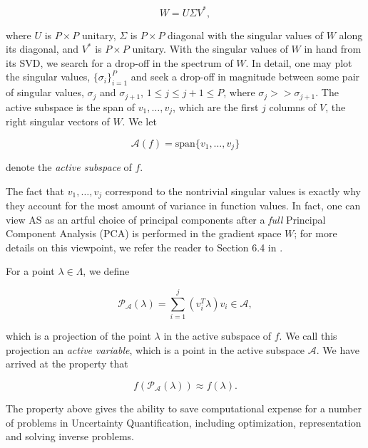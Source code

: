 \documentclass{amsart}
\newcommand{\A}{\mathcal{A}}
\begin{document}
\begin{equation} \label{eq:5}
W=U\Sigma V^*,
\end{equation} 

\noindent where $U$ is $P \times P$ unitary, $\Sigma$ is $P \times P$ diagonal with the singular values of $W$ along its diagonal, and $V^*$ is $P \times P$ unitary. With the singular values of $W$ in hand from its SVD, we search for a drop-off in the spectrum of $W$. In detail, one may plot the singular values, $\{\sigma_i\}_{i=1}^P$ and seek a drop-off in magnitude between some pair of singular values, $\sigma_{j}$ and $\sigma_{j+1}$, $1\leq j \leq j+1 \leq P$, where $\sigma_{j}>>\sigma_{j+1}$. The active subspace is the span of $v_1,\ldots,v_{j}$, which are the first $j$ columns of $V$, the right singular vectors of $W$. We let

\begin{equation} \label{eq:6}
\A(f)=\text{span}\{v_1,\ldots,v_j\}
\end{equation}

\noindent denote the \textit{active subspace} of $f$.


The fact that $v_1,\ldots,v_{j}$ correspond to the nontrivial singular values is exactly why they account for the most amount of variance in function values. In fact, one can view AS as an artful choice of principal components after a \textit{full} Principal Component Analysis (PCA) is performed in the gradient space $W$; for more details on this viewpoint, we refer the reader to Section 6.4 in \cite{Russi}.

For a point $\lambda \in \Lambda$, we define

\begin{equation} \label{eq:7}
  \mathcal{P}_\A(\lambda)=\sum_{i=1}^{j}\left( v_i^T \lambda\right)v_i \in \A, 
\end{equation}

\noindent which is a projection of the point $\lambda$ in the active subspace of $f$. We call this projection an \textit{active variable}, which is a point in the active subspace $\A$. We have arrived at the property that 

\begin{equation} \label{eq:8}
f\left(\mathcal{P}_\A(\lambda)\right) \approx f(\lambda).
\end{equation}

The property above gives the ability to save computational expense for a number of problems in Uncertainty Quantification, including optimization, representation and solving inverse problems. 
\end{document}
